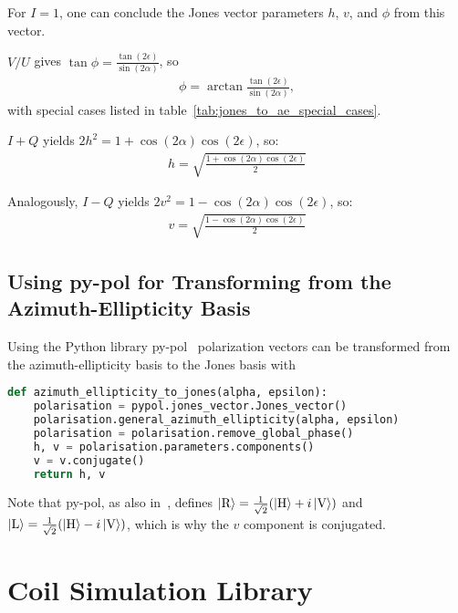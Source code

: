 For $I = 1$, one can conclude the Jones vector parameters $h$, $v$, and $\phi$ from this vector.

$V / U$ gives $\tan \phi = \frac{\tan(2\epsilon)}{\sin(2\alpha)}$, so
\begin{align}
    \phi = \arctan \frac{\tan(2\epsilon)}{\sin(2\alpha)},
\end{align}
with special cases listed in table~\ref{tab:jones_to_ae_special_cases}.

$I + Q$ yields $ 2 h^2 = 1 + \cos(2\alpha) \cos(2\epsilon)$, so:
\begin{align}
    h = \sqrt{\frac{1 + \cos(2\alpha) \cos(2\epsilon)}{2}}
\end{align}

Analogously, $I - Q$ yields $ 2 v^2 = 1 - \cos(2\alpha) \cos(2\epsilon)$, so:
\begin{align}
    v = \sqrt{\frac{1 - \cos(2\alpha) \cos(2\epsilon)}{2}}
\end{align}


\section*{Using py-pol for Transforming from the Azimuth-Ellipticity Basis}
Using the Python library py-pol~\cite{noauthor_python_nodate} polarization vectors can be transformed from the azimuth-ellipticity basis to the Jones basis with
\begin{lstlisting}[language=Python]
def azimuth_ellipticity_to_jones(alpha, epsilon):
    polarisation = pypol.jones_vector.Jones_vector()
    polarisation.general_azimuth_ellipticity(alpha, epsilon)
    polarisation = polarisation.remove_global_phase()
    h, v = polarisation.parameters.components()
    v = v.conjugate()
    return h, v
\end{lstlisting}

Note that py-pol, as also in~\cite{trager_springer_2012}, defines $\Ket{\text{R}} = \frac{1}{\sqrt{2}}(\Ket{\text{H}}+i\Ket{\text{V}})$ and $\Ket{\text{L}} = \frac{1}{\sqrt{2}}(\Ket{\text{H}}-i\Ket{\text{V}})$, which is why the $v$ component is conjugated.




\chapter{Coil Simulation Library}\label{ch:coil_simulation_library}
